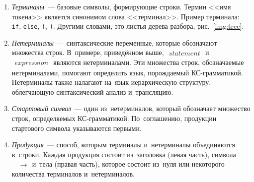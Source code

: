\begin{enumerate} 
	\item{\textit{Терминалы}~--- базовые символы, формирующие строки. Термин <<имя токена>> является синонимом слова <<терминал>>. Пример терминала: \texttt{if}, \texttt{else}, \texttt{(}, \texttt{)}}. Другими словами, это листья дерева разбора, рис.~\ref{img:tree}.
	\item{\textit{Нетерминалы}~--- синтаксические переменные, которые обозначают множества строк. В~примере, приведённом выше, $\begin{aligned} statement \end{aligned}$ и~$\begin{aligned} expression \end{aligned}$ являются нетерминалами. Эти множества строк, обозначаемые нетерминалами, помогают определить язык, порождаемый КС-грамматикой. Нетерминалы также налагают на~язык иерархическую структуру, облегчающую синтаксический анализ и~трансляцию.}
	\item{\textit{Стартовый символ}~--- один из~нетерминалов, который обозначает множество строк, определяемых КС-грамматикой. По~соглашению, продукции стартового символа указываются первыми.}
	\item{\textit{Продукция}~--- способ, которым терминалы и~нетерминалы объединяются в~строки. Каждая продукция состоит из~заголовка (левая часть), символа $\begin{aligned} &\to \end{aligned}$ и~тела (правая часть), которое состоит из~нуля или некоторого количества терминалов и~нетерминалов.}
\end{enumerate}
